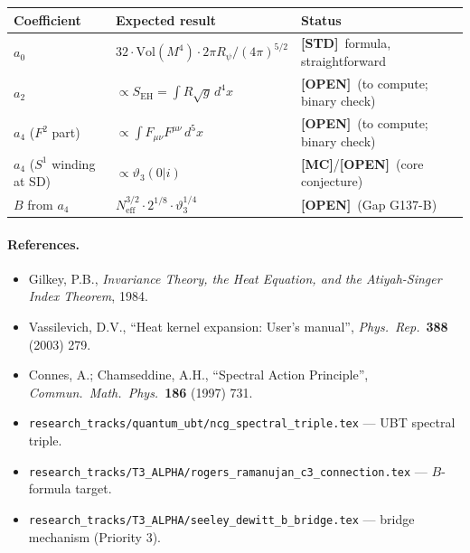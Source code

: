 \documentclass[12pt,a4paper]{article}
\theoremstyle{definition}
\theoremstyle{remark}
\newcommand{\STD}{\textbf{[STD]}}
\newcommand{\MC}{\textbf{[MC]}}
\newcommand{\OPEN}{\textbf{[OPEN]}}
\begin{document}
\begin{tcolorbox}[colback=blue!3!white, colframe=blue!55!black,
  title={Seeley-DeWitt coefficient status for $D_{\mathrm{UBT}}$}]
\begin{center}
\begin{tabular}{lll}
\toprule
\textbf{Coefficient} & \textbf{Expected result} & \textbf{Status} \\
\midrule
$a_0$ & $32\cdot\mathrm{Vol}(M^4)\cdot 2\pi R_\psi/(4\pi)^{5/2}$ &
  \STD\ formula, straightforward \\
$a_2$ & $\propto S_{\mathrm{EH}} = \int R\sqrt{g}\,d^4x$ &
  \OPEN\ (to compute; binary check) \\
$a_4$ ($F^2$ part) & $\propto \int F_{\mu\nu}F^{\mu\nu}\,d^5x$ &
  \OPEN\ (to compute; binary check) \\
$a_4$ ($S^1$ winding at SD) & $\propto\vartheta_3(0|i)$ &
  \MC/\OPEN\ (core conjecture) \\
$B$ from $a_4$ & $N_{\mathrm{eff}}^{3/2}\cdot 2^{1/8}\cdot\vartheta_3^{1/4}$ &
  \OPEN\ (Gap G137-B) \\
\bottomrule
\end{tabular}
\end{center}
\end{tcolorbox}

\paragraph{References.}
\begin{itemize}
  \item Gilkey, P.B., \textit{Invariance Theory, the Heat Equation, and the
    Atiyah-Singer Index Theorem}, 1984.
  \item Vassilevich, D.V., ``Heat kernel expansion: User's manual'',
    \textit{Phys.\ Rep.}\ \textbf{388} (2003) 279.
  \item Connes, A.; Chamseddine, A.H., ``Spectral Action Principle'',
    \textit{Commun.\ Math.\ Phys.}\ \textbf{186} (1997) 731.
  \item \texttt{research\_tracks/quantum\_ubt/ncg\_spectral\_triple.tex} --- UBT spectral triple.
  \item \texttt{research\_tracks/T3\_ALPHA/rogers\_ramanujan\_c3\_connection.tex} ---
    $B$-formula target.
  \item \texttt{research\_tracks/T3\_ALPHA/seeley\_dewitt\_b\_bridge.tex} ---
    bridge mechanism (Priority 3).
\end{itemize}
\end{document}
